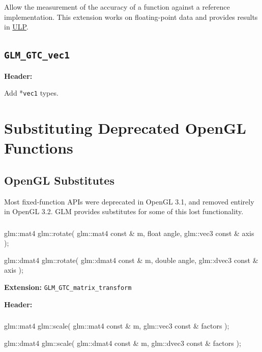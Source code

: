 \documentclass{scrartcl}
\numberwithin{figure}{subsection}
\begin{document}
Allow the measurement of the accuracy of a function against a reference implementation. This extension works on floating-point data and provides results in \href{http://ljk.imag.fr/membres/Carine.Lucas/TPScilab/JMMuller/ulp-toms.pdf}{ULP}.

\subsection{\texttt{GLM\_GTC\_vec1}}
\textbf{Header:} 

Add *\verb|vec1| types.

\newpage{}

\section{Substituting Deprecated OpenGL Functions}

\subsection{OpenGL Substitutes}

Most fixed-function APIs were deprecated in OpenGL 3.1, and removed entirely in OpenGL 3.2.  GLM provides substitutes for some of this lost functionality.

\subsubsection{}

\begin{cppcode}
glm::mat4 glm::rotate(
  glm::mat4 const & m,
  float angle, 
  glm::vec3 const & axis
);

glm::dmat4 glm::rotate(
  glm::dmat4 const & m,
  double angle, 
  glm::dvec3 const & axis
);
\end{cppcode}

\textbf{Extension:} \verb|GLM_GTC_matrix_transform|

\textbf{Header:} 


\subsubsection{}

\begin{cppcode}
glm::mat4 glm::scale(
  glm::mat4 const & m,
  glm::vec3 const & factors
);

glm::dmat4 glm::scale(
  glm::dmat4 const & m, 
  glm::dvec3 const & factors
);
\end{cppcode}
\end{document}
